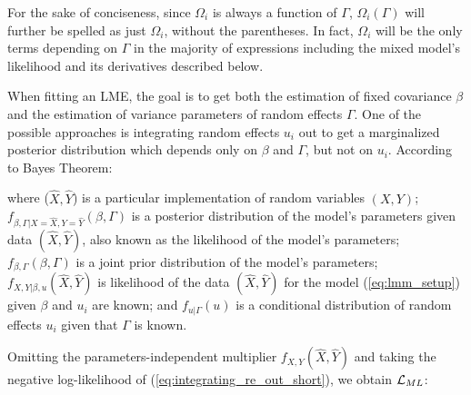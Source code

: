 \documentclass[11pt,letterpaper]{article}
\numberwithin{equation}{section} %
\numberwithin{figure}{section} %
\numberwithin{table}{section} %
\begin{document}

For the sake of conciseness, since $\Omega_i$ is always a function of $\Gamma$, $\Omega_i(\Gamma)$ will further be spelled as just $\Omega_i$, without the parentheses. In fact, $\Omega_i$ will be the only terms depending on $\Gamma$ in the majority of expressions including the mixed model's likelihood and its derivatives described below.
 
 When fitting an LME, the goal is to get both the estimation of fixed covariance $\beta$ and the estimation of variance parameters of random effects $\Gamma$. One of the possible approaches is integrating random effects $u_i$ out to get a marginalized posterior distribution which depends only on $\beta$ and $\Gamma$, but not on $u_i$. According to Bayes Theorem:
 

where ($\hat{X}, \hat{Y}$) is a particular implementation of random variables $(X, Y)$; $f_{\beta, \Gamma | X=\hat{X}, Y=\hat{Y}}(\beta, \Gamma)$ is a posterior distribution of the model's parameters given data $(\hat{X}, \hat{Y})$, also known as the likelihood of the model's parameters; $f_{\beta, \Gamma}(\beta, \Gamma)$ is a joint prior distribution of the model's parameters; $f_{X, Y | \beta, u}(\hat{X}, \hat{Y})$ is likelihood of the data $(\hat{X}, \hat{Y})$ for the model (\ref{eq:lmm_setup}) given $\beta$ and $u_i$ are known; and $f_{u|\Gamma}(u)$ is a conditional distribution of random effects $u_i$ given that $\Gamma$ is known. 

Omitting the parameters-independent multiplier $f_{X, Y}(\hat{X}, \hat{Y})$ and taking the negative log-likelihood of (\ref{eq:integrating_re_out_short}), we obtain $\operatorname{\mathcal{L}}_{ML}$:

\end{document}
